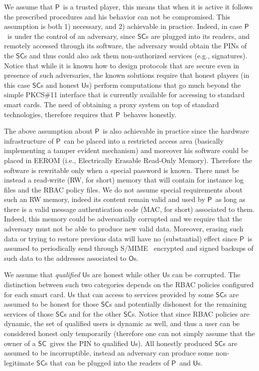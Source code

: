 \documentclass[runningheads]{llncs}
\newcommand{\Owner}{\ensuremath{\mathsf{O}}}
\newcommand{\User}{\ensuremath{\mathsf{U}}}
\newcommand{\Proxy}{\ensuremath{\mathsf{P}}}
\newcommand{\SC}{\ensuremath{\mathsf{SC}}}
\begin{document}
We assume that \Proxy\ is a trusted player, this means that when it is active it follows the prescribed procedures and his behavior can not be compromised. This assumption is both 1) necessary, and 2) achievable in practice. Indeed, in case \Proxy\ is under the control of an adversary, since \SC s are plugged into its readers, and remotely accessed through its software, the adversary would obtain the PINs of the \SC s and thus could also ask them non-authorized services (e.g., signatures). Notice that while it is known how to design protocols that are secure even in presence of such adversaries, the known solutions require that honest players (in this case \SC s and honest \User s) perform computations that go much beyond the simple PKCS\#11 interface that is currently available for accessing to standard smart cards. The need of obtaining a proxy system on top of standard technologies, therefore requires
that \Proxy\ behaves honestly.

The above assumption about \Proxy\ is also achievable in practice since the hardware infrastructure of \Proxy\ can be placed into a restricted access area (basically implementing a tamper evident mechanism) and moreover his software could be placed in EEROM (i.e., Electrically Erasable Read-Only Memory). Therefore
the software is rewritable only when a special password is known. There must be instead a read-write (RW, for short) memory that will contain for instance log files and the RBAC policy files. We do not assume special requirements about such an RW memory, indeed its content remain valid and used by \Proxy\ as long as there is a valid message authentication code (MAC, for short) associated to them. Indeed, this memory could be adversarially corrupted and we require that the adversary must not be
able to produce new valid data. Moreover, erasing such data or trying to restore previous data will have no (substantial) effect since \Proxy\ is assumed to periodically send through S/MIME~\cite{smime} encrypted and signed backups of such data to the addresses associated to \Owner s.

We assume that {\em qualified} \User s are honest while other \User s can be corrupted. The distinction between such two categories depends on the RBAC policies configured for each smart card. \User s that can access to services provided by some \SC s are assumed to be honest for those \SC s and potentially dishonest for the remaining services of those \SC s and for the other \SC s. Notice that since RBAC policies are dynamic, the set of qualified users is dynamic as well, and thus a user can be considered honest only temporarily (therefore one can not simply assume that the owner of a \SC\ gives the PIN to qualified \User s).
All honestly produced \SC s are assumed to be incorruptible, instead an adversary can produce some non-legitimate \SC s that can be plugged into the readers of \Proxy\ and \User s.
\end{document}
